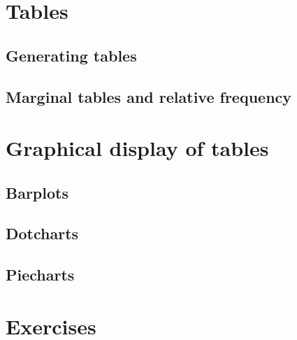 \section{Tables} \label{tables}
\subsection{Generating tables}
\subsection{Marginal tables and relative frequency}
\section{Graphical display of tables}
\subsection{Barplots}
\subsection{Dotcharts}
\subsection{Piecharts}
\section{Exercises}

